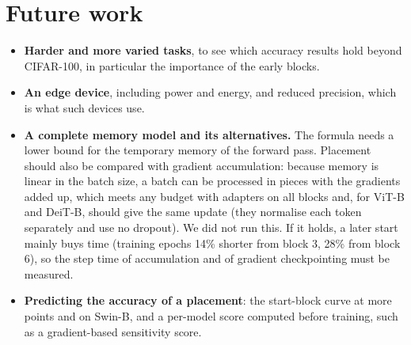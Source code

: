 \section{Future work}

\begin{itemize}
  \item \textbf{Harder and more varied tasks}, to see which accuracy results hold beyond CIFAR-100, in particular
        the importance of the early blocks.
  \item \textbf{An edge device}, including power and energy, and reduced precision, which is what such devices use.
  \item \textbf{A complete memory model and its alternatives.} The formula needs a lower bound for the temporary
        memory of the forward pass. Placement should also be compared with gradient accumulation: because memory is
        linear in the batch size, a batch can be processed in pieces with the gradients added up, which meets any
        budget with adapters on all blocks and, for ViT-B and DeiT-B, should give the same update (they normalise
        each token separately and use no dropout). We did not run this. If it holds, a later start mainly buys
        time (training epochs 14\% shorter from block 3, 28\% from block 6), so the step time of accumulation and of
        gradient checkpointing must be measured.
  \item \textbf{Predicting the accuracy of a placement}: the start-block curve at more points and on Swin-B, and a
        per-model score computed before training, such as a gradient-based sensitivity score.
\end{itemize}
